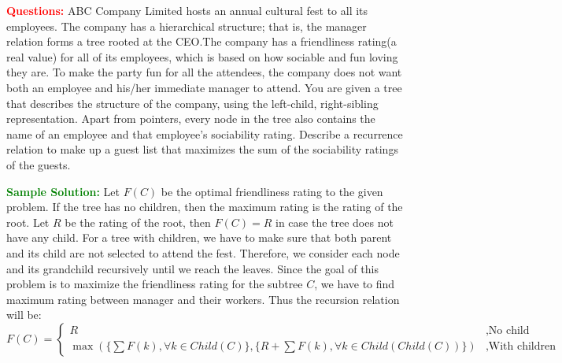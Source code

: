 \problem

\textcolor{Red}{\textbf{Questions:}}
ABC Company Limited hosts an annual cultural fest to all its employees. The company has a hierarchical structure; that is, the manager relation forms a tree rooted at the CEO.The company has a friendliness rating(a real value) for all of its employees, which is based on how sociable and fun loving they are. To make the party fun for all the attendees, the company does not want both an employee and his/her immediate manager to attend. You are given a tree that describes the structure of the company, using the left-child, right-sibling representation. Apart from pointers, every node in the tree also contains the name of an employee and that employee's sociability rating. Describe a recurrence relation to make up a guest list that maximizes the sum of the sociability ratings of the guests.

\textcolor{Green}{\textbf{Sample Solution:}}
Let $F(C)$ be the optimal friendliness rating to the given problem. If the tree has no children, then the maximum rating is the rating of the root. Let $R$ be the rating of the root, then $F(C)= R$ in case the tree does not have any child. For a tree with children, we have to make sure that both parent and its child are not selected to attend the fest. Therefore, we consider each node and its grandchild recursively until we reach the leaves. Since the goal of this problem is to maximize the friendliness rating for the subtree $C$, we have to find maximum rating between manager and their workers. Thus the recursion relation will be:
\begin{equation}
	F(C) =
	\begin{cases}
	R       &,  \text{No child}\\
	\max\left(\{\sum F(k),\forall k \in Child(C)\}, \{R + \sum F(k),\forall k \in Child(Child(C))\}\right)  &, \text{With children}
	\end{cases}
\end{equation}